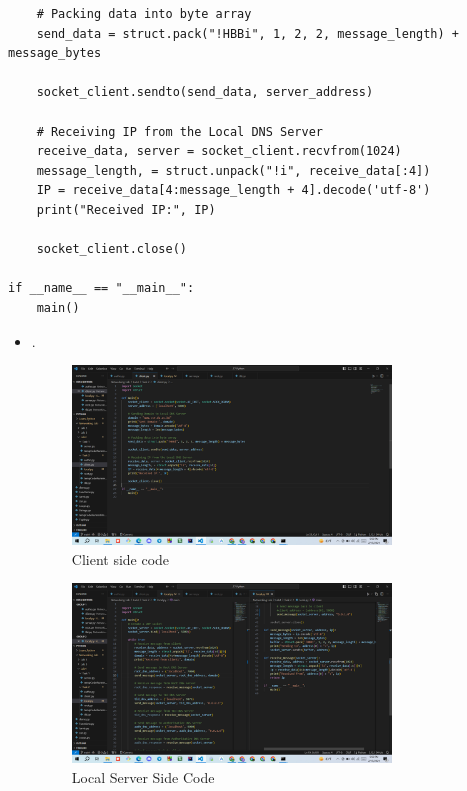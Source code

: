 \documentclass[11pt]{article}
\begin{document}
\begin{itemize}
\begin{verbatim}
    # Packing data into byte array
    send_data = struct.pack("!HBBi", 1, 2, 2, message_length) + message_bytes

    socket_client.sendto(send_data, server_address)

    # Receiving IP from the Local DNS Server
    receive_data, server = socket_client.recvfrom(1024)
    message_length, = struct.unpack("!i", receive_data[:4])
    IP = receive_data[4:message_length + 4].decode('utf-8')
    print("Received IP:", IP)

    socket_client.close()

if __name__ == "__main__":
    main()

\end{verbatim}

\begin{itemize}
    \item \textbf{}
    
  . 
    \begin{figure}[H]
        \centering
        \includegraphics[width=0.8\textwidth]{Screenshot (164).png}
        \caption{Client side code}
        \label{fig:1}
    \end{figure}
    
    \begin{figure}[H]
        \centering
        \includegraphics[width=0.8\textwidth]{Screenshot (165).png}
        \caption{Local Server Side Code}
        \label{fig:2}
    \end{figure}
    

\end{itemize}
\end{itemize}
\end{document}
